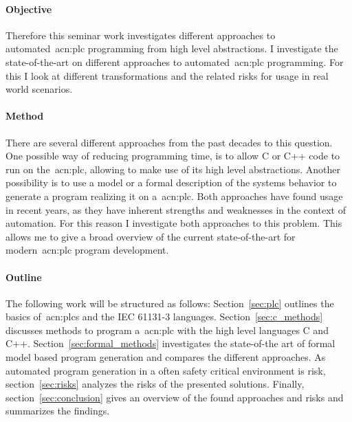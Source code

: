 \paragraph{Objective}
Therefore this seminar work investigates different approaches to automated~\gls{acn:plc} programming from high level abstractions.
I investigate the state-of-the-art on different approaches to automated~\gls{acn:plc} programming.
For this I look at different transformations and the related risks for usage in real world scenarios.

\paragraph{Method}
There are several different approaches from the past decades to this question.
One possible way of reducing programming time, is to allow C or C++ code to run on the~\gls{acn:plc}, allowing to make use of its high level abstractions.
Another possibility is to use a model or a formal description of the systems behavior to generate a program realizing it on a~\gls{acn:plc}.
Both approaches have found usage in recent years, as they have inherent strengths and weaknesses in the context of automation.
For this reason I investigate both approaches to this problem.
This allows me to give a broad overview of the current state-of-the-art for modern~\gls{acn:plc} program development.

\paragraph{Outline}
The following work will be structured as follows: 
Section~\ref{sec:plc} outlines the basics of~\glspl{acn:plc} and the IEC 61131-3 languages. 
Section~\ref{sec:c_methods} discusses methods to program a~\gls{acn:plc} with the high level languages C and C++.
Section~\ref{sec:formal_methods} investigates the state-of-the art of formal model based program generation and compares the different approaches.
As automated program generation in a often safety critical environment is risk, section~\ref{sec:risks} analyzes the risks of the presented solutions.
Finally, section~\ref{sec:conclusion} gives an overview of the found approaches and risks and summarizes the findings.
